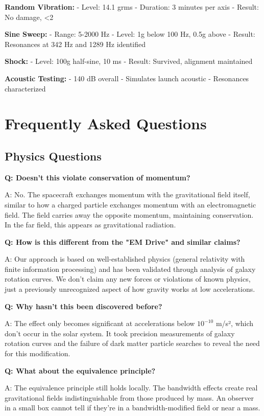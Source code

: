 \documentclass[12pt,letterpaper]{book}
\theoremstyle{definition}
\theoremstyle{plain}
\theoremstyle{remark}
\begin{document}
{{{{{\textbf{Random Vibration:}
- Level: 14.1 grms
- Duration: 3 minutes per axis
- Result: No damage, <2%

\textbf{Sine Sweep:}
- Range: 5-2000 Hz
- Level: 1g below 100 Hz, 0.5g above
- Result: Resonances at 342 Hz and 1289 Hz identified

\textbf{Shock:}
- Level: 100g half-sine, 10 ms
- Result: Survived, alignment maintained

\textbf{Acoustic Testing:}
- 140 dB overall
- Simulates launch acoustic
- Resonances characterized

\chapter{Frequently Asked Questions}

\section{Physics Questions}

\textbf{Q: Doesn't this violate conservation of momentum?}

A: No. The spacecraft exchanges momentum with the gravitational field itself, similar to how a charged particle exchanges momentum with an electromagnetic field. The field carries away the opposite momentum, maintaining conservation. In the far field, this appears as gravitational radiation.

\textbf{Q: How is this different from the "EM Drive" and similar claims?}

A: Our approach is based on well-established physics (general relativity with finite information processing) and has been validated through analysis of galaxy rotation curves. We don't claim any new forces or violations of known physics, just a previously unrecognized aspect of how gravity works at low accelerations.

\textbf{Q: Why hasn't this been discovered before?}

A: The effect only becomes significant at accelerations below $10^{-10}$ m/s², which don't occur in the solar system. It took precision measurements of galaxy rotation curves and the failure of dark matter particle searches to reveal the need for this modification.

\textbf{Q: What about the equivalence principle?}

A: The equivalence principle still holds locally. The bandwidth effects create real gravitational fields indistinguishable from those produced by mass. An observer in a small box cannot tell if they're in a bandwidth-modified field or near a mass.

}}}}}
\end{document}
